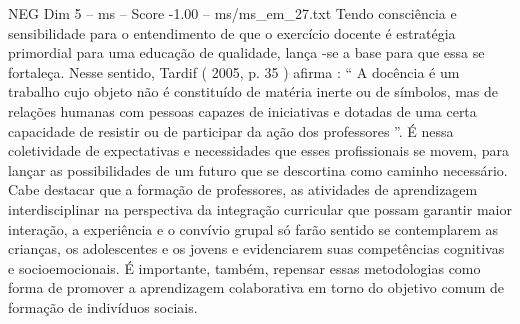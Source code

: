 \begin{textsample}{NEG Dim 5 – ms – Score -1.00 – ms/ms\_em\_27.txt}
Tendo consciência e sensibilidade para o entendimento de que o exercício docente é estratégia primordial para uma educação de qualidade, lança -se a base para que essa se fortaleça.
Nesse sentido, Tardif ( 2005, p. 35 ) afirma : “ A docência é um trabalho cujo objeto não é constituído de matéria inerte ou de símbolos, mas de relações humanas com pessoas capazes de iniciativas e dotadas de uma certa capacidade de resistir ou de participar da ação dos professores ”.
É nessa coletividade de expectativas e necessidades que esses profissionais se movem, para lançar as possibilidades de um futuro que se descortina como caminho necessário.
Cabe destacar que a formação de professores, as atividades de aprendizagem interdisciplinar na perspectiva da integração curricular que possam garantir maior interação, a experiência e o convívio grupal só farão sentido se contemplarem as crianças, os adolescentes e os jovens e evidenciarem suas competências cognitivas e socioemocionais.
É importante, também, repensar essas metodologias como forma de promover a aprendizagem colaborativa em torno do objetivo comum de formação de indivíduos sociais.

\end{textsample}
